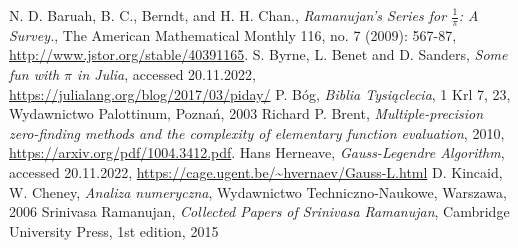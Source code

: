 \documentclass[11pt, wide, leqno]{mwart}
\begin{document}
\begin{thebibliography}{69}
        N. D. Baruah, B. C., Berndt, and H. H. Chan.,
        \textit{Ramanujan's Series for $\frac1\pi$: A Survey.}, 
        The American Mathematical Monthly 116, no. 7 (2009): 567-87,
        \url{http://www.jstor.org/stable/40391165}.
        S. Byrne, L. Benet and D. Sanders,
        \textit{Some fun with $\pi$ in Julia},
        accessed 20.11.2022,
        \url{https://julialang.org/blog/2017/03/piday/}
        P. Bóg,
        \textit{Biblia Tysiąclecia}, 1 Krl 7, 23,
        Wydawnictwo Palottinum,
        Poznań, 2003
        Richard P. Brent,
        \textit{Multiple-precision zero-finding methods and the complexity of elementary function evaluation},
        2010,
        \url{https://arxiv.org/pdf/1004.3412.pdf}.
        Hans Herneave,
        \textit{Gauss-Legendre Algorithm},
        accessed 20.11.2022,
        \url{https://cage.ugent.be/~hvernaev/Gauss-L.html}
        D. Kincaid, W. Cheney,
        \textit{Analiza numeryczna},
        Wydawnictwo Techniczno-Naukowe,
        Warszawa, 2006
        Srinivasa Ramanujan,
        \textit{Collected Papers of Srinivasa Ramanujan}, 
        Cambridge University Press,
        1st edition,
        2015
\end{thebibliography}
\end{document}
